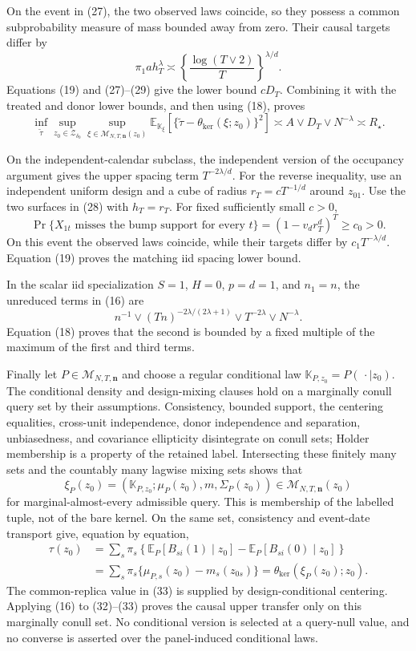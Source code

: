 On the event in (27), the two observed laws coincide, so they possess a
common subprobability measure of mass bounded away from zero.  Their causal
targets differ by
\[
 \pi_1ah_T^\lambda
 \asymp\left\{\frac{\log(T\vee2)}{T}\right\}^{\lambda/d}.    \tag{29}
\]
Equations (19) and (27)--(29) give the lower bound \(cD_T\).  Combining it
with the treated and donor lower bounds, and then using (18), proves
\[
 \inf_{\widetilde\tau}\sup_{z_0\in\mathcal Z_{\delta_0}}
 \sup_{\xi\in\mathcal M_{N,T,\mathbf n}(z_0)}
 \mathbb E_{\mathbb K_\xi}
 [\{\widetilde\tau-\theta_{\mathrm{ker}}(\xi;z_0)\}^2]
 \asymp A\vee D_T\vee N^{-\lambda}\asymp R_\star.          \tag{30}
\]

On the independent-calendar subclass, the independent version of the
occupancy argument gives the upper spacing term \(T^{-2\lambda/d}\).  For
the reverse inequality, use an independent uniform design and a cube of
radius \(r_T=cT^{-1/d}\) around \(z_{01}\).  Use the two surfaces in (28)
with \(h_T=r_T\).  For fixed sufficiently small \(c>0\),
\[
 \Pr\{X_{1t}\text{ misses the bump support for every }t\}
 =(1-v_dr_T^d)^T\ge c_0>0.                                   \tag{31}
\]
On this event the observed laws coincide, while their targets differ by
\(c_1T^{-\lambda/d}\).  Equation (19) proves the matching iid spacing
lower bound.

In the scalar iid specialization \(S=1\), \(H=0\), \(p=d=1\), and
\(n_1=n\), the unreduced terms in (16) are
\[
 n^{-1}\vee(Tn)^{-2\lambda/(2\lambda+1)}
 \vee T^{-2\lambda}\vee N^{-\lambda}.
\]
Equation (18) proves that the second is bounded by a fixed multiple of the
maximum of the first and third terms.

Finally let \(P\in\mathcal M_{N,T,\mathbf n}\) and choose a regular
conditional law \(\mathbb K_{P,z_0}=P(\,\cdot\mid z_0)\).  The conditional
density and design-mixing clauses hold on a marginally conull query set by
their assumptions.  Consistency, bounded support, the centering equalities,
cross-unit independence, donor independence and separation, unbiasedness,
and covariance ellipticity disintegrate on conull sets; Holder membership is
a property of the retained label.  Intersecting these finitely many sets and
the countably many lagwise mixing sets shows that
\[
 \xi_P(z_0)=(\mathbb K_{P,z_0};\mu_P(z_0),m,\Sigma_P(z_0))
 \in\mathcal M_{N,T,\mathbf n}(z_0)                           \tag{32}
\]
for marginal-almost-every admissible query.  This is membership of the
labelled tuple, not of the bare kernel.  On the same set, consistency and
event-date transport give, equation by equation,
\[
 \begin{split}
 \tau(z_0)
 &=\sum_s\pi_s\left\{
   \mathbb E_P[B_{si}(1)\mid z_0]
  -\mathbb E_P[B_{si}(0)\mid z_0]\right\}\\
 &=\sum_s\pi_s\{\mu_{P,s}(z_0)-m_s(z_{0s})\}
 =\theta_{\mathrm{ker}}(\xi_P(z_0);z_0).                     \tag{33}
 \end{split}
\]
The common-replica value in (33) is supplied by design-conditional
centering.  Applying (16) to (32)--(33) proves the causal upper transfer
only on this marginally conull set.  No conditional version is selected at a
query-null value, and no converse is asserted over the panel-induced
conditional laws.


